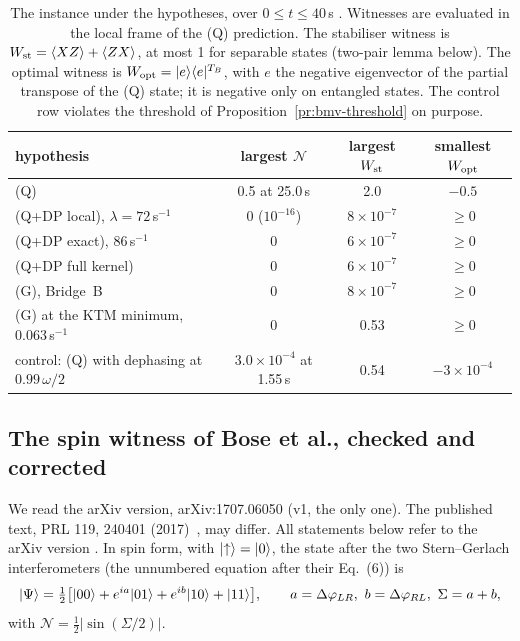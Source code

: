 \begin{table}[ht]\centering\small
\caption{The instance under the hypotheses, over $0\le t\le40$\,s . Witnesses are evaluated in the local frame of the (Q)
prediction. The stabiliser witness is $W_{\rm st}=\langle XZ\rangle+\langle ZX\rangle$, at most 1 for separable states (two-pair lemma
below). The optimal witness is $W_{\rm opt}=\ket e\bra e^{T_B}$, with $e$ the negative eigenvector of the partial transpose of the (Q) state;
it is negative only on entangled states. The control row violates the threshold of Proposition~\ref{pr:bmv-threshold} on
purpose.}\label{tab:bmv-hyp}
\begin{tabularx}{\textwidth}{@{}Lccc@{}}\toprule
hypothesis & largest $\mathcal N$ & largest $W_{\rm st}$ & smallest $W_{\rm opt}$\\\midrule
(Q) & 0.5 at 25.0\,s & 2.0 & $-0.5$\\
(Q+DP local), $\lambda=72$\,s$^{-1}$ & 0 ($10^{-16}$) & $8\times10^{-7}$ & $\ge0$\\
(Q+DP exact), 86\,s$^{-1}$ & 0 & $6\times10^{-7}$ & $\ge0$\\
(Q+DP full kernel) & 0 & $6\times10^{-7}$ & $\ge0$\\
(G), Bridge~B & 0 & $8\times10^{-7}$ & $\ge0$\\
(G) at the KTM minimum, 0.063\,s$^{-1}$ & 0 & 0.53 & $\ge0$\\
control: (Q) with dephasing at $0.99\,\omega/2$ & $3.0\times10^{-4}$ at 1.55\,s & 0.54 & $-3\times10^{-4}$\\\bottomrule
\end{tabularx}
\end{table}

\subsection{The spin witness of Bose et al., checked and corrected}\label{ss:bmv-witness}

We read the arXiv version, arXiv:1707.06050 (v1, the only one). The published text, PRL 119, 240401 (2017)~\cite{bose}, may differ. All
statements below refer to the arXiv version . In spin form, with $\lvert \uparrow\rangle=\lvert 0\rangle$, the state after the two
Stern--Gerlach interferometers (the unnumbered equation after their Eq.~(6)) is
\begin{equation}\label{eq:bmv-spin}
\lvert \Psi\rangle=\tfrac12\bigl[\lvert 00\rangle+e^{ia}\lvert 01\rangle+e^{ib}\lvert 10\rangle+\lvert 11\rangle\bigr],\qquad a=\Delta\varphi_{LR},\ b=\Delta\varphi_{RL},\ \Sigma=a+b ,
\end{equation}
with $\mathcal N=\tfrac12|\sin(\Sigma/2)|$.

